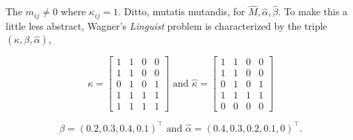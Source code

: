 \documentclass[11pt]{article}
\begin{document}

The $m_{ij}\neq{}0$ where $\kappa_{ij}=1$. Ditto, mutatis mutandis,
for $\hat{M},\hat{\alpha},\hat{\beta}$. To make this a little less
abstract, Wagner's \emph{Linguist} problem is characterized by the
triple $(\kappa,\beta,\hat{\alpha})$,

\begin{equation}
  \label{eq:m4}
  \kappa=\left[
  \begin{array}{cccc}
    1 & 1 & 0 & 0 \\
    1 & 1 & 0 & 0 \\
    0 & 1 & 0 & 1 \\
    1 & 1 & 1 & 1 \\
    1 & 1 & 1 & 1
  \end{array}
\right]\mbox{ and }
  \hat{\kappa}=\left[
  \begin{array}{cccc}
    1 & 1 & 0 & 0 \\
    1 & 1 & 0 & 0 \\
    0 & 1 & 0 & 1 \\
    1 & 1 & 1 & 1 \\
    0 & 0 & 0 & 0
  \end{array}
\right]
\end{equation}

\begin{equation}
  \label{eq:m5}
  \beta=(0.2,0.3,0.4,0.1)^{\intercal}\mbox{ and }\hat{\alpha}=(0.4,0.3,0.2,0.1,0)^{\intercal}.
\end{equation}
\end{document}
